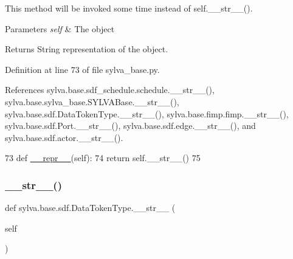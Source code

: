 This method will be invoked some time instead of self.\+\_\+\+\_\+str\+\_\+\+\_\+().


\begin{DoxyParams}{Parameters}
{\em self} & The object\\
\hline
\end{DoxyParams}
\begin{DoxyReturn}{Returns}
String representation of the object. 
\end{DoxyReturn}


Definition at line 73 of file sylva\+\_\+base.\+py.



References sylva.\+base.\+sdf\+\_\+schedule.\+schedule.\+\_\+\+\_\+str\+\_\+\+\_\+(), sylva.\+base.\+sylva\+\_\+base.\+S\+Y\+L\+V\+A\+Base.\+\_\+\+\_\+str\+\_\+\+\_\+(), sylva.\+base.\+sdf.\+Data\+Token\+Type.\+\_\+\+\_\+str\+\_\+\+\_\+(), sylva.\+base.\+fimp.\+fimp.\+\_\+\+\_\+str\+\_\+\+\_\+(), sylva.\+base.\+sdf.\+Port.\+\_\+\+\_\+str\+\_\+\+\_\+(), sylva.\+base.\+sdf.\+edge.\+\_\+\+\_\+str\+\_\+\+\_\+(), and sylva.\+base.\+sdf.\+actor.\+\_\+\+\_\+str\+\_\+\+\_\+().


\begin{DoxyCode}
73     \textcolor{keyword}{def }\hyperlink{namespacesylva_1_1code__generation_1_1floorplanner_a84f24b1e40f5425e9bb40ab45ccbd10f}{\_\_repr\_\_}(self):
74         \textcolor{keywordflow}{return} self.\_\_str\_\_()
75 
\end{DoxyCode}
\mbox{\label{classsylva_1_1base_1_1sdf_1_1_data_token_type_ab44771f0368f95e63030117f12b7e36d}} 
\subsubsection{\texorpdfstring{\+\_\+\+\_\+str\+\_\+\+\_\+()}{\_\_str\_\_()}}
{\footnotesize\ttfamily def sylva.\+base.\+sdf.\+Data\+Token\+Type.\+\_\+\+\_\+str\+\_\+\+\_\+ (\begin{DoxyParamCaption}\item[{}]{self }\end{DoxyParamCaption})}







